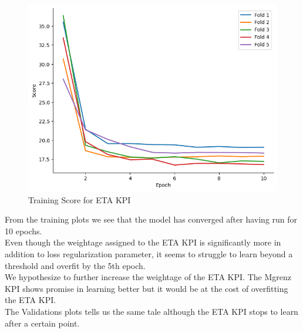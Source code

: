 \documentclass{report} %
\begin{document}
\begin{figure}[H]
    \hfill
    \begin{minipage}[b]{0.325\textwidth}
        \includegraphics[width=\textwidth]{./ReportImages/train_score_y2.png}
        \caption{\centering Training Score for ETA \ac{KPI}}
        \label{fig:Training Score for ETA grid}
    \end{minipage}
\end{figure}

From the training plots we see that the model has converged after having run for 10 epochs.\\
Even though the weightage assigned to the ETA \ac{KPI} is significantly more in addition to loss regularization parameter, it seems to struggle to learn beyond a threshold and overfit by the 5th epoch.\\
We hypothesize to further increase the weightage of the ETA \ac{KPI}.
The Mgrenz \ac{KPI} shows promise in learning better but it would be at the cost of overfitting the ETA \ac{KPI}.\\
The Validations plots tells us the same tale although the ETA \ac{KPI} stops to learn after a certain point.
\end{document}

